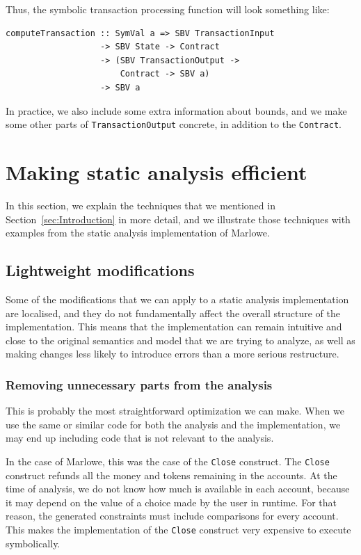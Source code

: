 \documentclass[english,runningheads]{llncs}
\begin{document}
Thus, the symbolic transaction processing function will look something
like:

\begin{verbatim}
computeTransaction :: SymVal a => SBV TransactionInput
                   -> SBV State -> Contract
                   -> (SBV TransactionOutput ->
                       Contract -> SBV a)
                   -> SBV a
\end{verbatim}

In practice, we also include some extra information about bounds,
and we make some other parts of \texttt{TransactionOutput} concrete,
in addition to the \texttt{Contract}.

\section{Making static analysis efficient\label{sec:Making-static-analysis-efficient}}

In this section, we explain the techniques that we mentioned in Section~\ref{sec:Introduction}
in more detail, and we illustrate those techniques with examples from
the static analysis implementation of Marlowe.

\subsection{Lightweight modifications\label{subsec:Lightweight-modifications}}

Some of the modifications that we can apply to a static analysis implementation
are localised, and they do not fundamentally affect the overall structure
of the implementation. This means that the implementation can remain
intuitive and close to the original semantics and model that we are
trying to analyze, as well as making changes less likely to introduce
errors than a more serious restructure.

\subsubsection{Removing unnecessary parts from the analysis }

This is probably the most straightforward optimization we can make.
When we use the same or similar code for both the analysis and the
implementation, we may end up including code that is not relevant
to the analysis.

In the case of Marlowe, this was the case of the \texttt{Close} construct.
The \texttt{Close} construct refunds all the money and tokens remaining
in the accounts. At the time of analysis, we do not know how much
is available in each account, because it may depend on the value of
a choice made by the user in runtime. For that reason, the generated
constraints must include comparisons for every account. This makes
the implementation of the \texttt{Close} construct very expensive
to execute symbolically.
\end{document}
